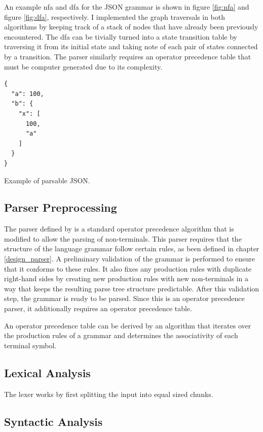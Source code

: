 An example \gls{nfa} and \gls{dfa} for the JSON grammar is shown in figure \ref{fig:nfa} and figure
\ref{fig:dfa}, respectively. I implemented the graph traversals in both algorithms by keeping track
of a stack of nodes that have already been previously encountered. The \gls{dfa} can be tivially
turned into a state transition table by traversing it from its initial state and  taking note of
each pair of states connected by a transition. The parser similarly requires an operator precedence
table that must be computer generated due to its complexity.

\begin{listing}[t]
\begin{verbatim}
{
  "a": 100,
  "b": {
    "x": [
      100,
      "a"
    ]
  }
}
\end{verbatim}
\caption{Example of parsable JSON.}
\hrulefill
\label{lst:json_example}
\end{listing}

\subsection{Parser Preprocessing} 

The parser defined by \cite{barenghi_parallel_2015} is a standard operator
precedence algorithm that is modified to allow the parsing of non-terminals.
This parser requires that the structure of the language grammar follow certain
rules, as been defined in chapter \ref{design_parser}. A preliminary validation
of the grammar is performed to ensure that it conforms to these rules. It also
fixes any production rules with duplicate right-hand sides by creating new
production rules with new non-terminals in a way that keeps the resulting parse
tree structure predictable. After this validation step, the grammar is ready to
be parsed. Since this is an operator precedence parser, it additionally requires
an operator precedence table.

An operator precedence table can be derived by an algorithm that iterates over
the production rules of a grammar and determines the associativity of each
terminal symbol. 

\subsection{Lexical Analysis}

The lexer works by first splitting the input into equal sized chunks. 

\subsection{Syntactic Analysis}


